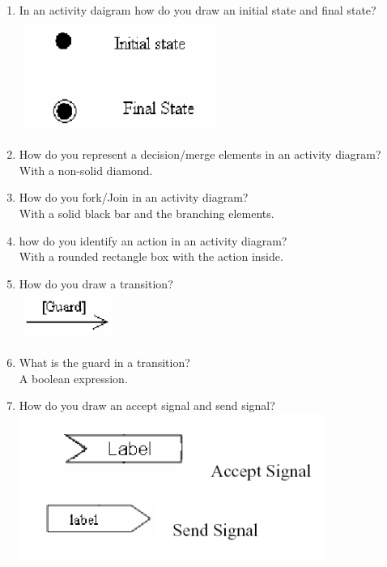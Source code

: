 \documentclass[10pt]{article}
\begin{document}
\begin{enumerate}
      \item In an activity daigram how do you draw an initial state and final state?\\
            \includegraphics*{actif.png}\\

      \item How do you represent a decision/merge elements in an activity diagram?\\
            With a non-solid diamond.\\

      \item How do you fork/Join in an activity diagram?\\
            With a solid black bar and the branching elements.\\

      \item how do you identify an action in an activity diagram?\\
            With a rounded rectangle box with the action inside.\\

      \item How do you draw a transition?\\
            \includegraphics*{trans.png}\\

      \item What is the guard in a transition?\\
            A boolean expression.\\
      \item How do you draw an accept signal and send signal?\\
            \includegraphics*{signals.png}\\


\end{enumerate}
\end{document}
